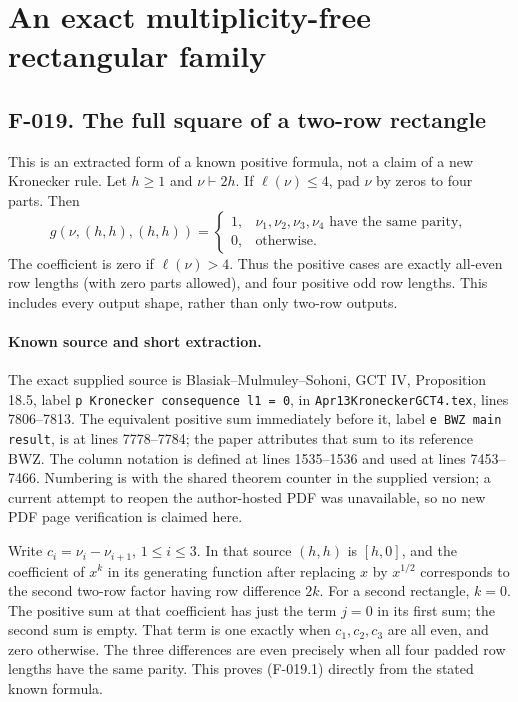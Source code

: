 \section{An exact multiplicity-free rectangular family}

\subsection*{F-019. The full square of a two-row rectangle}
This is an extracted form of a known positive formula, not a
claim of a new Kronecker rule. Let $h\geq1$ and
$\nu\vdash2h$. If $\ell(\nu)\leq4$, pad $\nu$ by zeros
to four parts. Then
\[
 g(\nu,(h,h),(h,h))=
 \begin{cases}
 1,&\nu_1,\nu_2,\nu_3,\nu_4\text{ have the same parity},\\
 0,&\text{otherwise}.
 \end{cases}                                          \tag{F-019.1}
\]
The coefficient is zero if $\ell(\nu)>4$. Thus the positive
cases are exactly all-even row lengths (with zero parts
allowed), and four positive odd row lengths. This includes
every output shape, rather than only two-row outputs.

\paragraph{Known source and short extraction.}
The exact supplied source is Blasiak--Mulmuley--Sohoni,
GCT IV, Proposition 18.5, label
\texttt{p Kronecker consequence l1 = 0}, in
\texttt{Apr13KroneckerGCT4.tex}, lines 7806--7813. The
equivalent positive sum immediately before it, label
\texttt{e BWZ main result}, is at lines 7778--7784; the
paper attributes that sum to its reference BWZ. The column
notation is defined at lines 1535--1536 and used at lines
7453--7466. Numbering is with the
shared theorem counter in the supplied version; a current
attempt to reopen the author-hosted PDF was unavailable,
so no new PDF page verification is claimed here.

Write $c_i=\nu_i-\nu_{i+1}$, $1\leq i\leq3$.
In that source $(h,h)$ is $[h,0]$, and the coefficient of
$x^k$ in its generating function after replacing $x$ by
$x^{1/2}$ corresponds to the second two-row factor having
row difference $2k$. For a second rectangle, $k=0$.
The positive sum at that coefficient has just the term
$j=0$ in its first sum; the second sum is empty. That term
is one exactly when $c_1,c_2,c_3$ are all even, and zero
otherwise. The three differences are even precisely when
all four padded row lengths have the same parity. This
proves (F-019.1) directly from the stated known formula.

